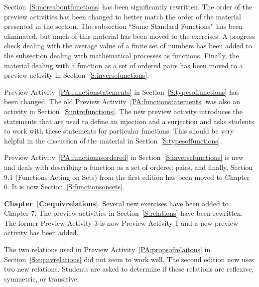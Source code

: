 Section~\ref{S:moreaboutfunctions} has been significantly rewritten.  The order of the preview activities has been changed to better match the order of the material presented in the section.  The subsection ``Some Standard Functions'' has been eliminated, but much of this material has been moved to the exercises.  A progress check dealing with the average value of a finite set of numbers has been added to the subsection dealing with mathematical processes as functions.  Finally, the material dealing with a function as a set of ordered pairs has been moved to a preview activity in 
Section~\ref{S:inversefunctions}.  

Preview Activity~\ref{PA:functionstatements} in Section~\ref{S:typesoffunctions} has been changed.  The old Preview Activity~\ref{PA:functionstatements} was also an activity in Section~\ref{S:introfunctions}.  The new preview activity introduces the statements that are used to define an injection and a surjection and asks students to work with these statements for particular functions.  This should be very helpful in the discussion of the material in Section~\ref{S:typesoffunctions}.

Preview Activity~\ref{PA:functionasordered}  in 
Section~\ref{S:inversefunctions} is new and deals with describing a function as a set of ordered pairs, and finally, Section 9.1 (Functions Acting on Sets) from the first edition has been moved to Chapter 6.  It is now Section~\ref{S:functionsonsets}.
 

\vskip6pt
\noindent
\textbf{Chapter~\ref{C:equivrelations}}.  Several new exercises have been added to Chapter 7.  The preview activities in Section~\ref{S:relations} have been rewritten.  The former Preview Activity 3 is now Preview Activity 1 and a new preview activity has been added.

The two relations used in Preview Activity~\ref{PA:propsofrelaitons} in 
Section~\ref{S:equivrelations} did not seem to work well.  The second edition now uses two new relations.  Students are asked to determine if these relations are reflexive, symmetric, or transitive.


